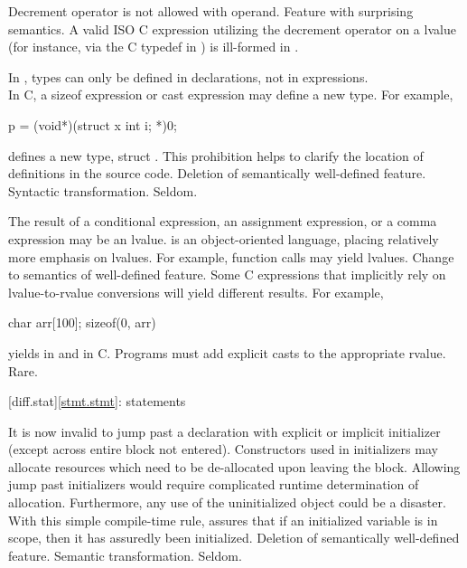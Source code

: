 \change
Decrement operator is not allowed with  operand.
\rationale
Feature with surprising semantics.
\effect
A valid ISO C expression utilizing the decrement operator on
a  lvalue
(for instance, via the C typedef in )
is ill-formed in \Cpp{}.

\change
In \Cpp{}, types can only be defined in declarations, not in expressions.\\
In C, a sizeof expression or cast expression may define a new type.
For example,
\begin{codeblock}
p = (void*)(struct x {int i;} *)0;
\end{codeblock}
defines a new type, struct .
\rationale
This prohibition helps to clarify the location of
definitions in the source code.
\effect
Deletion of semantically well-defined feature.
\difficulty
Syntactic transformation.
\howwide
Seldom.

%
%
%
\change
The result of a conditional expression, an assignment expression, or a comma expression may be an lvalue.
\rationale
\Cpp{} is an object-oriented language, placing relatively
more emphasis on lvalues.  For example, function calls may
yield lvalues.
\effect
Change to semantics of well-defined feature.  Some C
expressions that implicitly rely on lvalue-to-rvalue
conversions will yield different results.  For example,

\begin{codeblock}
char arr[100];
sizeof(0, arr)
\end{codeblock}

yields
in \Cpp{} and
in C.
\difficulty
Programs must add explicit casts to the appropriate rvalue.
\howwide
Rare.

[diff.stat]{\ref{stmt.stmt}: statements}

\change
It is now invalid to jump past a declaration with explicit or implicit initializer (except across entire block not entered).
\rationale
Constructors used in initializers may allocate
resources which need to be de-allocated upon leaving the
block.
Allowing jump past initializers would require
complicated runtime determination of allocation.
Furthermore, any use of the uninitialized object could be a
disaster.
With this simple compile-time rule, \Cpp{} assures that
if an initialized variable is in scope, then it has assuredly been
initialized.
\effect
Deletion of semantically well-defined feature.
\difficulty
Semantic transformation.
\howwide
Seldom.

